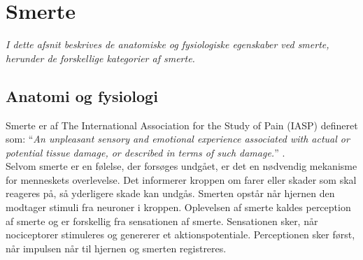 \section{Smerte}
\textit{I dette afsnit beskrives de anatomiske og fysiologiske egenskaber ved smerte, herunder de forskellige kategorier af smerte.}

\subsection{Anatomi og fysiologi}
Smerte er af The International Association for the Study of Pain (IASP) defineret som: “\textit{An unpleasant sensory and emotional experience associated with actual or potential tissue damage, or described in terms of such damage.}” \citep{Carmon}.\\
Selvom smerte er en følelse, der forsøges undgået, er det en nødvendig mekanisme for menneskets overlevelse. Det informerer kroppen om farer eller skader som skal reageres på, så yderligere skade kan undgås.
Smerten opstår når hjernen den modtager stimuli fra neuroner i kroppen. Oplevelsen af smerte kaldes perception af smerte og er forskellig fra sensationen af smerte. Sensationen sker, når nociceptorer stimuleres og genererer et aktionspotentiale. Perceptionen sker først, når impulsen når til hjernen og smerten registreres. \citep{Martini}

